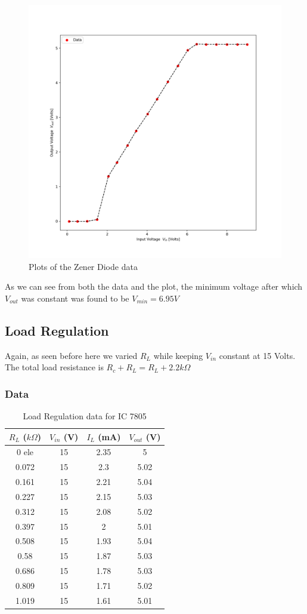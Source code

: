 \documentclass[10pt]{scrartcl}
\theoremstyle{definition}
\begin{document}
\begin{figure}[!h]
    \centering
    \includegraphics[width=0.45\linewidth]{linereg-ic.png}
    \caption{Plots of the Zener Diode data}
\end{figure}
As we can see from both the data and the plot, the minimum voltage after which
$V_{out}$ was constant was found to be $\boxed{V_{min} = 6.95 V}$
\subsection{Load Regulation}
Again, as seen before here we varied $R_L$ while keeping $V_{in}$ constant at 15 Volts.
The total load resistance is $R_c + R_L = R_L + 2.2 k\Omega$
\subsubsection{Data}
\begin{table}[!h]
    \centering
    \caption{Load Regulation data for IC 7805}
    \begin{tabular}{|c|c|c|c|}
    \hline
        \textbf{$R_L$ ($k\Omega$)} & \textbf{$V_{in}$ (V)} & \textbf{$I_L$ (mA)} & \textbf{$V_{out}$ (V)} \\ \hline
        0 ele& 15 & 2.35 & 5 \\ \hline
        0.072 & 15 & 2.3 & 5.02 \\ \hline
        0.161 & 15 & 2.21 & 5.04 \\ \hline
        0.227 & 15 & 2.15 & 5.03 \\ \hline
        0.312 & 15 & 2.08 & 5.02 \\ \hline
        0.397 & 15 & 2 & 5.01 \\ \hline
        0.508 & 15 & 1.93 & 5.04 \\ \hline
        0.58 & 15 & 1.87 & 5.03 \\ \hline
        0.686 & 15 & 1.78 & 5.03 \\ \hline
        0.809 & 15 & 1.71 & 5.02 \\ \hline
        1.019 & 15 & 1.61 & 5.01 \\ \hline
    \end{tabular}
\end{table}
\end{document}
